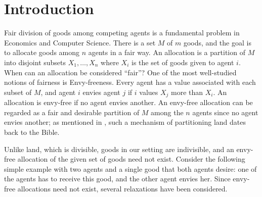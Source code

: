 \documentclass{article}
\begin{document}
\section{Introduction}

Fair division of goods among competing agents is a fundamental problem in Economics and Computer Science. There is a set $M$ of $m$ goods, and the goal is to allocate goods among $n$ agents in a fair way. An allocation is a partition of $M$ into disjoint subsets $X_1, \ldots, X_n$ where $X_i$ is the set of goods given to agent $i$. When can an allocation be considered “fair”? One of the most well-studied notions of fairness is Envy-freeness. Every agent has a value associated with each subset of $M$, and agent $i$ envies agent $j$ if $i$ values $X_j$ more than $X_i$. An allocation is envy-free if no agent envies another. An envy-free allocation can be regarded as a fair and desirable partition of $M$ among the $n$ agents since no agent envies another; as mentioned in \cite{reference26}, such a mechanism of partitioning land dates back to the Bible.

Unlike land, which is divisible, goods in our setting are indivisible, and an envy-free allocation of the given set of goods need not exist. Consider the following simple example with two agents and a single good that both agents desire: one of the agents has to receive this good, and the other agent envies her. Since envy-free allocations need not exist, several relaxations have been considered.



\end{document}
